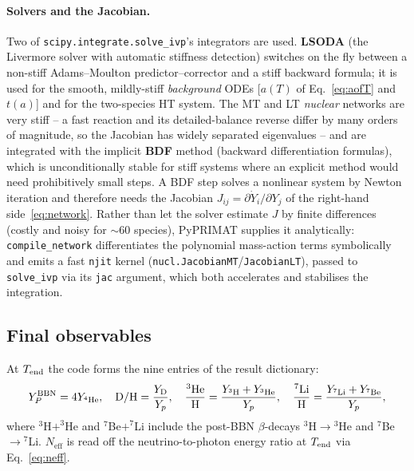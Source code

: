 \documentclass[11pt,a4paper]{article}
\newcommand{\Neff}{N_{\mathrm{eff}}}
\newcommand{\YP}{Y_P}
\newcommand{\DoH}{\mathrm{D/H}}
\newcommand{\code}[1]{\texttt{#1}}
\begin{document}
\paragraph{Solvers and the Jacobian.}
Two of \code{scipy.integrate.solve\_ivp}'s integrators are used. \textbf{LSODA}
(the Livermore solver with automatic stiffness detection) switches on the fly
between a non-stiff Adams--Moulton predictor--corrector and a stiff backward
formula; it is used for the smooth, mildly-stiff \emph{background} ODEs
[$a(T)$ of Eq.~\eqref{eq:aofT} and $t(a)$] and for the two-species HT system.
The MT and LT \emph{nuclear} networks are very stiff -- a fast reaction and its
detailed-balance reverse differ by many orders of magnitude, so the Jacobian has
widely separated eigenvalues -- and are integrated with the implicit
\textbf{BDF} method (backward differentiation formulas), which is
unconditionally stable for stiff systems where an explicit method would need
prohibitively small steps. A BDF step solves a nonlinear system by Newton
iteration and therefore needs the Jacobian
$J_{ij}=\partial\dot Y_i/\partial Y_j$ of the right-hand
side~\eqref{eq:network}. Rather than let the solver estimate $J$ by finite
differences (costly and noisy for $\sim$60 species), PyPRIMAT supplies it
analytically: \code{compile\_network} differentiates the polynomial mass-action
terms symbolically and emits a fast \code{njit} kernel
(\code{nucl.JacobianMT}/\code{JacobianLT}), passed to \code{solve\_ivp} via its
\code{jac} argument, which both accelerates and stabilises the integration.

\subsection{Final observables}\label{sec:obs}
At $T_{\rm end}$ the code forms the nine entries of the result dictionary:
\begin{equation}
  \YP^{\rm BBN}=4Y_{^4{\rm He}},\quad
  \DoH=\frac{Y_{\rm D}}{Y_p},\quad
  \frac{^3{\rm He}}{\rm H}=\frac{Y_{^3{\rm H}}+Y_{^3{\rm He}}}{Y_p},\quad
  \frac{^7{\rm Li}}{\rm H}=\frac{Y_{^7{\rm Li}}+Y_{^7{\rm Be}}}{Y_p},
\end{equation}
where $^3$H$+^3$He and $^7$Be$+^7$Li include the post-BBN $\beta$-decays
$^3$H$\to{}^3$He and $^7$Be$\to{}^7$Li. $\Neff$ is read off the
neutrino-to-photon energy ratio at $T_{\rm end}$ via Eq.~\eqref{eq:neff}.
\end{document}
